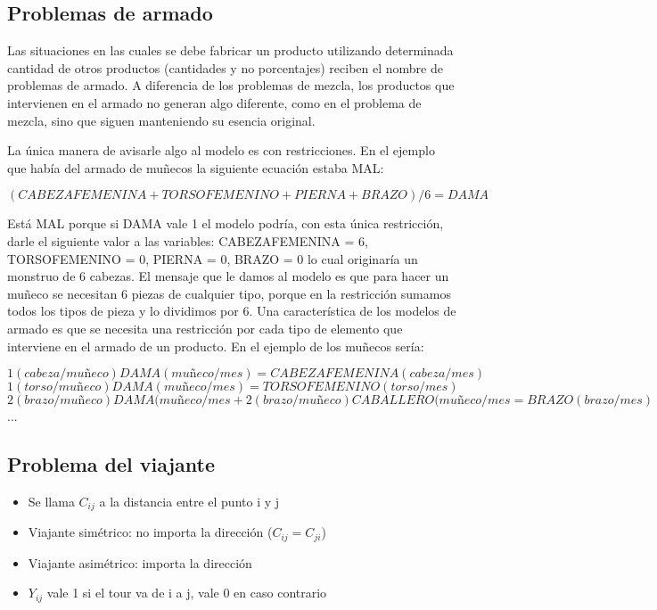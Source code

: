 \documentclass[titlepage,a4paper]{article}
\begin{document}
\vspace{0.5cm}

\subsection{Problemas de armado}

Las situaciones en las cuales se debe fabricar un producto utilizando determinada cantidad de otros productos (cantidades y no porcentajes) reciben el nombre de problemas de armado. A diferencia de los problemas de mezcla, los productos que intervienen en el armado no generan algo diferente, como en el problema de mezcla,
sino que siguen manteniendo su esencia original.

La única manera de avisarle algo al modelo es con restricciones. En el ejemplo que había del armado de muñecos la siguiente ecuación estaba MAL:

$$ (CABEZAFEMENINA + TORSOFEMENINO + PIERNA + BRAZO) / 6 = DAMA $$

Está MAL porque si DAMA vale 1 el modelo podría, con esta única restricción, darle el
siguiente valor a las variables:
CABEZAFEMENINA = 6, TORSOFEMENINO = 0, PIERNA = 0, BRAZO = 0 lo cual originaría un monstruo de 6 cabezas.
El mensaje que le damos al modelo es que para hacer un muñeco se necesitan 6 piezas de cualquier tipo, porque en la restricción sumamos todos los tipos de pieza y lo dividimos por 6.
Una característica de los modelos de armado es que se necesita una restricción por cada tipo de elemento que interviene en el armado de un producto. En el ejemplo de los muñecos sería:

$$ 1 (cabeza/muñeco) DAMA (muñeco/mes) = CABEZAFEMENINA (cabeza/mes) $$
$$ 1 (torso/muñeco) DAMA (muñeco/mes) = TORSOFEMENINO (torso/mes) $$
$$ 2 (brazo/muñeco) DAMA (muñeco/mes + 2 (brazo/muñeco) CABALLERO (muñeco/mes = BRAZO (brazo/mes)  $$
...

\vspace{0.5cm}

\subsection{Problema del viajante}

\begin{itemize}
    \item Se llama $C_{ij}$ a la distancia entre el punto i y j
    \item Viajante simétrico: no importa la dirección ($C_{ij} = C_{ji}$)
    \item Viajante asimétrico: importa la dirección
    \item $Y_{ij}$ vale 1 si el tour va de i a j, vale 0 en caso contrario
\end{itemize}
\end{document}

